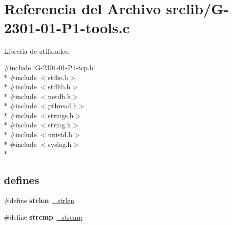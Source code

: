 \hypertarget{G-2301-01-P1-tools_8c}{}\section{Referencia del Archivo srclib/\+G-\/2301-\/01-\/\+P1-\/tools.c}
\label{G-2301-01-P1-tools_8c}


Libreria de utilidades.  


{\ttfamily \#include \char`\"{}G-\/2301-\/01-\/\+P1-\/tcp.\+h\char`\"{}}\\*
{\ttfamily \#include $<$stdio.\+h$>$}\\*
{\ttfamily \#include $<$stdlib.\+h$>$}\\*
{\ttfamily \#include $<$netdb.\+h$>$}\\*
{\ttfamily \#include $<$pthread.\+h$>$}\\*
{\ttfamily \#include $<$strings.\+h$>$}\\*
{\ttfamily \#include $<$string.\+h$>$}\\*
{\ttfamily \#include $<$unistd.\+h$>$}\\*
{\ttfamily \#include $<$syslog.\+h$>$}\\*
\subsection*{\textquotesingle{}defines\textquotesingle{}}
\begin{DoxyCompactItemize}
\item 
\hypertarget{G-2301-01-P1-tools_8c_a417fef1b5cd577cfc9a2836bb40fa885}{}\#define {\bfseries strlen}~\hyperlink{G-2301-01-P1-tools_8c_a6a6c1526db46f96786401e9dd46b35f7}{\+\_\+strlen}\label{G-2301-01-P1-tools_8c_a417fef1b5cd577cfc9a2836bb40fa885}

\item 
\hypertarget{G-2301-01-P1-tools_8c_a6b5d9a1031ac2602e31df1ba551bfafe}{}\#define {\bfseries strcmp}~\hyperlink{G-2301-01-P1-tools_8c_a32a248aed136dc3eac34cfb119642b6f}{\+\_\+strcmp}\label{G-2301-01-P1-tools_8c_a6b5d9a1031ac2602e31df1ba551bfafe}

\end{DoxyCompactItemize}
